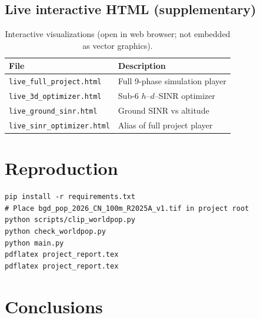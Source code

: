 \documentclass[11pt,a4paper]{article}
\begin{document}
\subsection{Live interactive HTML (supplementary)}
\label{sec:html}
\begin{table}[H]
\centering
\caption{Interactive visualizations (open in web browser; not embedded as vector graphics).}
\label{tab:live}
\begin{tabular}{ll}
\toprule
File & Description \\
\midrule
\texttt{live\_full\_project.html} & Full 9-phase simulation player \\
\texttt{live\_3d\_optimizer.html} & Sub-6 $h$--$d$--SINR optimizer \\
\texttt{live\_ground\_sinr.html} & Ground SINR vs altitude \\
\texttt{live\_sinr\_optimizer.html} & Alias of full project player \\
\bottomrule
\end{tabular}
\end{table}

\section{Reproduction}

\begin{lstlisting}[basicstyle=\ttfamily\small]
pip install -r requirements.txt
# Place bgd_pop_2026_CN_100m_R2025A_v1.tif in project root
python scripts/clip_worldpop.py
python check_worldpop.py
python main.py
pdflatex project_report.tex
pdflatex project_report.tex
\end{lstlisting}

\section{Conclusions}
\end{document}
